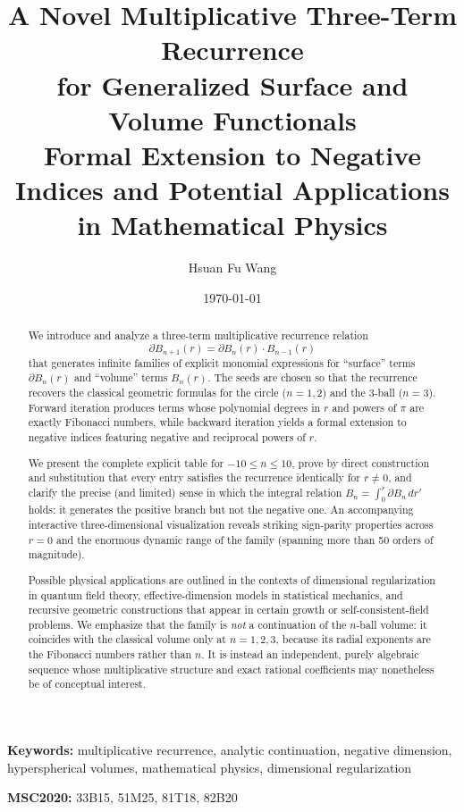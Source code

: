 \documentclass[11pt,a4paper]{article}
\title{\textbf{A Novel Multiplicative Three-Term Recurrence \\ for Generalized Surface and Volume Functionals}\\[0.3em]
\large Formal Extension to Negative Indices and Potential Applications in Mathematical Physics}
\author{Hsuan Fu Wang}
\date{\today}
\theoremstyle{definition}
\begin{document}
\maketitle

\begin{abstract}
We introduce and analyze a three-term multiplicative recurrence relation
\[
\partial B_{n+1}(r) = \partial B_n(r) \cdot B_{n-1}(r)
\]
that generates infinite families of explicit monomial expressions for ``surface'' terms \(\partial B_n(r)\) and ``volume'' terms \(B_n(r)\). The seeds are chosen so that the recurrence recovers the classical geometric formulas for the circle (\(n=1,2\)) and the 3-ball (\(n=3\)). Forward iteration produces terms whose polynomial degrees in \(r\) and powers of \(\pi\) are exactly Fibonacci numbers, while backward iteration yields a formal extension to negative indices featuring negative and reciprocal powers of \(r\).

We present the complete explicit table for \(-10 \leq n \leq 10\), prove by direct construction and substitution that every entry satisfies the recurrence identically for \(r \neq 0\), and clarify the precise (and limited) sense in which the integral relation \(B_n = \int_0^r \partial B_n \, dr'\) holds: it generates the positive branch but not the negative one. An accompanying interactive three-dimensional visualization reveals striking sign-parity properties across \(r = 0\) and the enormous dynamic range of the family (spanning more than 50 orders of magnitude). 

Possible physical applications are outlined in the contexts of dimensional regularization in quantum field theory, effective-dimension models in statistical mechanics, and recursive geometric constructions that appear in certain growth or self-consistent-field problems. We emphasize that the family is \emph{not} a continuation of the \(n\)-ball volume: it coincides with the classical volume only at \(n=1,2,3\), because its radial exponents are the Fibonacci numbers rather than \(n\). It is instead an independent, purely algebraic sequence whose multiplicative structure and exact rational coefficients may nonetheless be of conceptual interest.
\end{abstract}

\noindent\textbf{Keywords:} multiplicative recurrence, analytic continuation, negative dimension, hyperspherical volumes, mathematical physics, dimensional regularization

\noindent\textbf{MSC2020:} 33B15, 51M25, 81T18, 82B20
\end{document}
